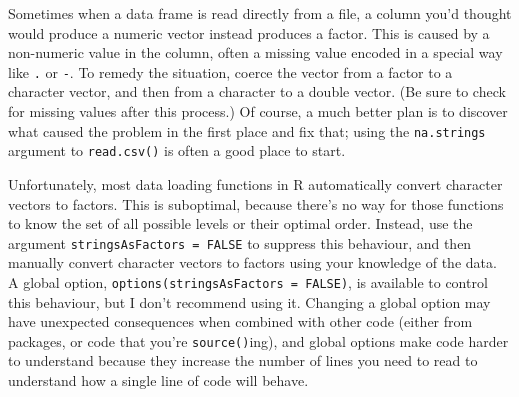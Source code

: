 Sometimes when a data frame is read directly from a file, a column you'd
thought would produce a numeric vector instead produces a factor. This
is caused by a non-numeric value in the column, often a missing value
encoded in a special way like \texttt{.} or \texttt{-}. To remedy the
situation, coerce the vector from a factor to a character vector, and
then from a character to a double vector. (Be sure to check for missing
values after this process.) Of course, a much better plan is to discover
what caused the problem in the first place and fix that; using the
\texttt{na.strings} argument to \texttt{read.csv()} is often a good
place to start.

\begin{Shaded}
\begin{Highlighting}[]
\StringTok{ }\NormalTok{(}\NormalTok{)}
\NormalTok{(}
\StringTok{ }\NormalTok{(}\NormalTok{, }\NormalTok{)}
\end{Highlighting}
\end{Shaded}

Unfortunately, most data loading functions in R automatically convert
character vectors to factors. This is suboptimal, because there's no way
for those functions to know the set of all possible levels or their
optimal order. Instead, use the argument
\texttt{stringsAsFactors = FALSE} to suppress this behaviour, and then
manually convert character vectors to factors using your knowledge of
the data. A global option, \texttt{options(stringsAsFactors = FALSE)},
is available to control this behaviour, but I don't recommend using it.
Changing a global option may have unexpected consequences when combined
with other code (either from packages, or code that you're
\texttt{source()}ing), and global options make code harder to understand
because they increase the number of lines you need to read to understand
how a single line of code will behave.

